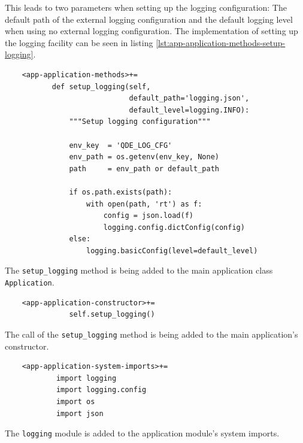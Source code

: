 \documentclass[10pt, openright, notitlepage]{scrreprt}
\begin{document}
This leads to two parameters when setting up the logging configuration: The
default path of the external logging configuration and the default logging
level when using no external logging configuration. The implementation of
setting up the logging facility can be seen in listing
\ref{lst:app-application-methods-setup-logging}.

\begin{listing}[H]
\begin{verbatim}
    <app-application-methods>+=
           def setup_logging(self,
                             default_path='logging.json',
                             default_level=logging.INFO):
               """Setup logging configuration"""
           
               env_key  = 'QDE_LOG_CFG'
               env_path = os.getenv(env_key, None)
               path     = env_path or default_path
           
               if os.path.exists(path):
                   with open(path, 'rt') as f:
                       config = json.load(f)
                       logging.config.dictConfig(config)
               else:
                   logging.basicConfig(level=default_level)
\end{verbatim}
\caption{\label{lst:app-application-methods-setup-logging}
The \texttt{setup\_logging} method is being added to the main application class \texttt{Application}.}
\end{listing}

\begin{listing}[H]
\begin{verbatim}
    <app-application-constructor>+=
               self.setup_logging()
\end{verbatim}
\caption{\label{lst:app-application-constructor-call-setup-logging}
The call of the \texttt{setup\_logging} method is being added to the main application's constructor.}
\end{listing}

\begin{listing}[H]
\begin{verbatim}
    <app-application-system-imports>+=
            import logging
            import logging.config
            import os
            import json
\end{verbatim}
\caption{\label{lst:app-application-system-imports-logging}
The \texttt{logging} module is added to the application module's system imports.}
\end{listing}
\end{document}
